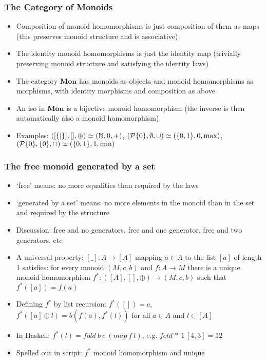 \documentclass[handout]{beamer}
\newcommand{\bfsf}[1]{{\boldsymbol{#1}}}
\newcommand{\Mon}{\bfsf{Mon}}
\begin{document}
\frame
  {   
    \frametitle{The Category of Monoids}\label{Ch2:CatMon}

 \begin{itemize}[<+->]
\item Composition of monoid homomorphisms is just composition of them as maps
(this preserves monoid structure and is associative)
\item The identity monoid homomorphisms is just the identity map 
(trivially preserving monoid structure and satisfying the identity laws)
\item The category $\Mon$ has monoids as objects and monoid homomorphisms
 as morphisms, with identity morphisms and composition as above
\item An iso in $\Mon$ is a bijective monoid  homomorphism (the inverse
is then automatically also a monoid  homomorphism) 
\item Examples: $([\{|\}],[],\oplus) \simeq (\mathbb{N},0,{+})$, 
$({\operatorname{\mathcal{P}}}{\{0\}},\emptyset,{\cup}) \simeq (\{0,1\},0,{\max})$,
$({\operatorname{\mathcal{P}}}{\{0\}},\{0\},{\cap}) \simeq (\{0,1\},1,{\min})$

 \end{itemize}

 }

\frame
  {   
    \frametitle{The free monoid generated by a set }\label{Ch2:freemonoid}

 \begin{itemize}[<+->]
\item `free' means: no more equalities than required by the laws
\item `generated by a set' means: no more elements in the monoid
 than in the set and required by the structure
\item Discussion: free and no generators, free and one generator, free and two generators, etc
\item A universal property: $[\_] : A \to [A]$ mapping 
$a\in A$ to the list $[a]$ of length 1 satisfies: for every monoid $(M,c,b)$ and $f: A\to M$
there is a unique monoid homomorphism $f^*: ([A],[],{\oplus}) \to (M,c,b)$ 
such that $f^*([a]) = f(a)$ %
\item Defining $f^*$ by list recursion: $f^*([]) = c$, 
$f^*([a]\oplus l) = b(f(a),f^*(l))$ for all $a\in A$ and $l\in[A]$
\item In Haskell: $f^*(l) = fold~b~c~(map~f~l)$, e.g. $fold\,{*}\,1\,[4,3] = 12$
\item Spelled out in script: $f^*$ monoid homomorphism and unique
 \end{itemize}

 }
\end{document}
